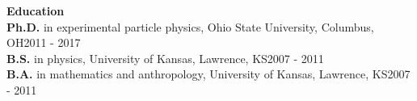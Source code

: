 \documentclass[line]{letter}
\begin{document}





{\vspace{10pt}\Large \bf Education\vspace{7pt}\\}
{\bf  Ph.D.} in experimental particle physics, Ohio State University, Columbus, OH\hfill 2011 - 2017\\
{\bf B.S.} in physics, University of Kansas, Lawrence, KS\hfill 2007 - 2011\\
{\bf B.A.} in mathematics and anthropology,  University of Kansas, Lawrence, KS\hfill 2007 - 2011
\end{document}
